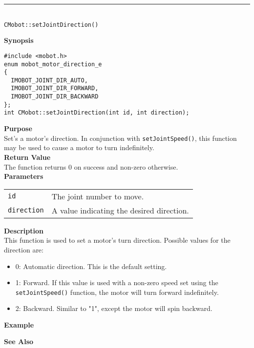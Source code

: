 \noindent
\vspace{5pt}
\rule{4.5in}{0.015in}\\
\noindent
{\LARGE \texttt{CMobot::setJointDirection()}}\\
{}

\noindent
{\bf Synopsis}
\vspace{-8pt}
\begin{verbatim}
#include <mobot.h>
enum mobot_motor_direction_e
{
  IMOBOT_JOINT_DIR_AUTO,
  IMOBOT_JOINT_DIR_FORWARD,
  IMOBOT_JOINT_DIR_BACKWARD
};
int CMobot::setJointDirection(int id, int direction);
\end{verbatim}

\noindent
{\bf Purpose}\\
Set's a motor's direction. In conjunction with \texttt{setJointSpeed()}, this
function may be used to cause a motor to turn indefinitely.\\

\noindent
{\bf Return Value}\\
The function returns 0 on success and non-zero otherwise.\\

\noindent
{\bf Parameters}
\vspace{-0.1in}
\begin{description}
\item               
\begin{tabular}{p{20 mm}p{145 mm}}
\texttt{id} & The joint number to move. \\
\texttt{direction} & A value indicating the desired direction.
\end{tabular}
\end{description}

\noindent
{\bf Description}\\
This function is used to set a motor's turn direction. Possible values for the
direction are:
\begin{itemize}
\item 0: Automatic direction. This is the default setting. 
\item 1: Forward. If this value is used with a non-zero speed set using the
\texttt{setJointSpeed()} function, the motor will turn forward indefinitely.
\item 2: Backward. Similar to "1", except the motor will spin backward.
\end{itemize}

\noindent
{\bf Example}\\
\noindent

\noindent
{\bf See Also}\\

